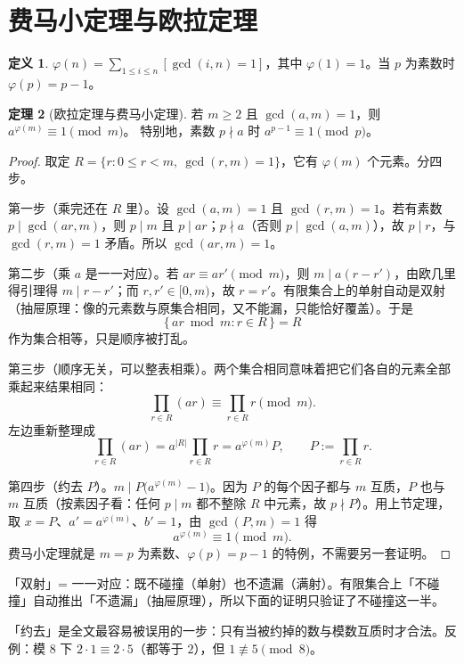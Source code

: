 \documentclass[UTF8,a4paper,11pt,oneside,openany,fontset=fandol]{ctexbook}
\theoremstyle{definition}
\newtheorem{definition}{定义}[chapter]
\newtheorem{theorem}[definition]{定理}
\newcommand{\iva}[1]{\left[#1\right]}
\begin{document}
\section{费马小定理与欧拉定理}
\begin{definition}
$\varphi(n)=\sum_{1\le i\le n}\iva{\gcd(i,n)=1}$，其中 $\varphi(1)=1$。当 $p$ 为素数时 $\varphi(p)=p-1$。
\end{definition}
\begin{theorem}[欧拉定理与费马小定理]
若 $m\ge2$ 且 $\gcd(a,m)=1$，则 $a^{\varphi(m)}\equiv1\pmod m$。
特别地，素数 $p\nmid a$ 时 $a^{p-1}\equiv1\pmod p$。
\end{theorem}
\begin{proof}
取定 $R=\{r:0\le r<m,\ \gcd(r,m)=1\}$，它有 $\varphi(m)$ 个元素。分四步。

第一步（乘完还在 $R$ 里）。设 $\gcd(a,m)=1$ 且 $\gcd(r,m)=1$。若有素数 $p\mid\gcd(ar,m)$，则 $p\mid m$ 且 $p\mid ar$；$p\nmid a$（否则 $p\mid\gcd(a,m)$），故 $p\mid r$，与 $\gcd(r,m)=1$ 矛盾。所以 $\gcd(ar,m)=1$。

第二步（乘 $a$ 是一一对应）。若 $ar\equiv ar'\pmod m$，则 $m\mid a(r-r')$，由欧几里得引理得 $m\mid r-r'$；而 $r,r'\in[0,m)$，故 $r=r'$。有限集合上的单射自动是双射（抽屉原理：像的元素数与原集合相同，又不能漏，只能恰好覆盖）。于是
\[
 \{\,ar\bmod m:r\in R\,\}=R
\]
作为集合相等，只是顺序被打乱。

第三步（顺序无关，可以整表相乘）。两个集合相同意味着把它们各自的元素全部乘起来结果相同：
\[
 \prod_{r\in R}(ar)\equiv\prod_{r\in R}r\pmod m.
\]
左边重新整理成
\[
 \prod_{r\in R}(ar)=a^{|R|}\prod_{r\in R}r=a^{\varphi(m)}P,\qquad P:=\prod_{r\in R}r .
\]

第四步（约去 $P$）。$m\mid P\big(a^{\varphi(m)}-1\big)$。因为 $P$ 的每个因子都与 $m$ 互质，$P$ 也与 $m$ 互质（按素因子看：任何 $p\mid m$ 都不整除 $R$ 中元素，故 $p\nmid P$）。用上节定理，取 $x=P$、$a'=a^{\varphi(m)}$、$b'=1$，由 $\gcd(P,m)=1$ 得
\[
 a^{\varphi(m)}\equiv1\pmod m.
\]
费马小定理就是 $m=p$ 为素数、$\varphi(p)=p-1$ 的特例，不需要另一套证明。
\end{proof}

\begin{tip}
「双射」= 一一对应：既不碰撞（单射）也不遗漏（满射）。有限集合上「不碰撞」自动推出「不遗漏」（抽屉原理），所以下面的证明只验证了不碰撞这一半。
\end{tip}

\begin{tip}
「约去」是全文最容易被误用的一步：只有当被约掉的数与模数互质时才合法。反例：模 $8$ 下 $2\cdot1\equiv2\cdot5$（都等于 $2$），但 $1\not\equiv5\pmod 8$。
\end{tip}
\end{document}
